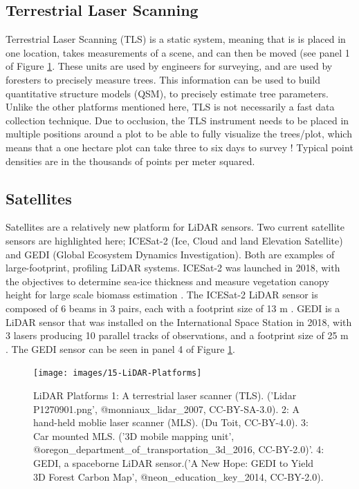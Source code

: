 \documentclass[
]{book}
\begin{document}
\hypertarget{terrestrial-laser-scanning}{%
\subsection{Terrestrial Laser Scanning}\label{terrestrial-laser-scanning}}

Terrestrial Laser Scanning (TLS) is a static system, meaning that is is placed in one location, takes measurements of a scene, and can then be moved (see panel 1 of Figure \ref{fig:15-LiDAR-Platforms}. These units are used by engineers for surveying, and are used by foresters to precisely measure trees. This information can be used to build quantitative structure models (QSM), to precisely estimate tree parameters. Unlike the other platforms mentioned here, TLS is not necessarily a fast data collection technique. Due to occlusion, the TLS instrument needs to be placed in multiple positions around a plot to be able to fully visualize the trees/plot, which means that a one hectare plot can take three to six days to survey \citep{wilkes_understanding_2015}! Typical point densities are in the thousands of points per meter squared.

\hypertarget{satellites}{%
\subsection{Satellites}\label{satellites}}

Satellites are a relatively new platform for LiDAR sensors. Two current satellite sensors are highlighted here; ICESat-2 (Ice, Cloud and land Elevation Satellite) and GEDI (Global Ecosystem Dynamics Investigation). Both are examples of large-footprint, profiling LiDAR systems. ICESat-2 was launched in 2018, with the objectives to determine sea-ice thickness and measure vegetation canopy height for large scale biomass estimation \citep{nasa_icesat-2_2021}. The ICESat-2 LiDAR sensor is composed of 6 beams in 3 pairs, each with a footprint size of 13 m \citep{nasa_icesat-2_2021}. GEDI is a LiDAR sensor that was installed on the International Space Station in 2018, with 3 lasers producing 10 parallel tracks of observations, and a footprint size of 25 m \citep{nasa_gedi_2021}. The GEDI sensor can be seen in panel 4 of Figure \ref{fig:15-LiDAR-Platforms}.

\begin{figure}
\texttt{[image: images/15-LiDAR-Platforms]} \caption{LiDAR Platforms 1: A terrestrial laser scanner (TLS). ('Lidar P1270901.png', @monniaux_lidar_2007, CC-BY-SA-3.0). 2: A hand-held moblie laser scanner (MLS). (Du Toit, CC-BY-4.0). 3: Car mounted MLS. ('3D mobile mapping unit', @oregon_department_of_transportation_3d_2016, CC-BY-2.0)'. 4: GEDI, a spaceborne LiDAR sensor.('A New Hope: GEDI to Yield 3D Forest Carbon Map', @neon_education_key_2014, CC-BY-2.0).}\label{fig:15-LiDAR-Platforms}
\end{figure}
\end{document}
